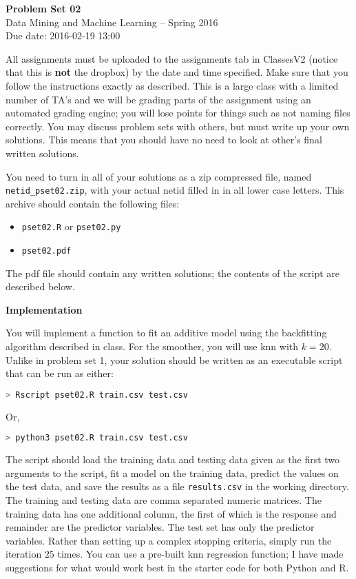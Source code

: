 \documentclass[12pt]{article}
\begin{document}
\begin{center}
{\bf Problem Set 02} \\
Data Mining and Machine Learning -- Spring 2016 \\
Due date: 2016-02-19 13:00
\end{center}

\medskip

All assignments must be uploaded to the assignments tab in ClassesV2
(notice that this is \textbf{not} the dropbox) by the date and time specified.
Make sure that you follow the instructions exactly as described.
This is a large class with a limited number of TA's and we will be
grading parts of the assignment using an automated grading engine;
you will lose points for things such as not naming files correctly.
You may discuss problem sets with others, but must write up your own
solutions. This means that you should have no need to look at other's
final written solutions.

You need to turn in all of your solutions as a zip compressed file, named
\texttt{netid\_pset02.zip}, with your actual netid filled in in all lower
case letters. This archive should contain the following files:
\begin{itemize}
\item \texttt{pset02.R} or \texttt{pset02.py}
\item \texttt{pset02.pdf}
\end{itemize}
The pdf file should contain any written solutions; the contents of the
script are described below.

\medskip

\textbf{Implementation}

You will implement a function to fit an additive model using the backfitting
algorithm described in class. For the smoother, you will use knn with $k=20$.
Unlike in problem set 1, your solution should be written as an executable script
that can be run as either:
\begin{lstlisting}[language=sh, basicstyle=\ttfamily]
> Rscript pset02.R train.csv test.csv
\end{lstlisting}
Or,
\begin{lstlisting}[language=sh, basicstyle=\ttfamily]
> python3 pset02.R train.csv test.csv
\end{lstlisting}
The script should load the training data and testing data given as the first
two arguments to the script, fit a model on the training data, predict the
values on the test data, and save the results as a file \texttt{results.csv}
in the working directory. The training and testing data are comma separated
numeric matrices. The training data has one additional column, the first of
which is the response and remainder are the predictor variables. The test set
has only the predictor variables. Rather than setting up a complex stopping
criteria, simply run the iteration $25$ times. You can use a pre-built knn
regression function; I have made suggestions for what would work best in
the starter code for both Python and R.
\end{document}
